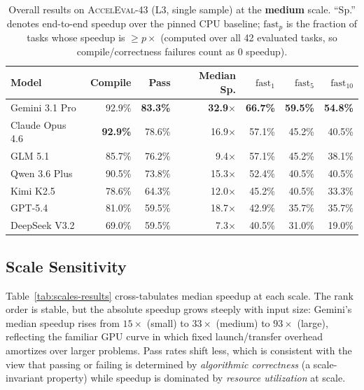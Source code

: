 \documentclass{article}
\begin{document}
\begin{table}[ht]
\centering
\small
\caption{Overall results on \textsc{AccelEval}-43 (L3, single sample) at the \textbf{medium} scale. ``Sp.'' denotes end-to-end speedup over the pinned CPU baseline; $\mathrm{fast}_p$ is the fraction of tasks whose speedup is $\geq p\times$ (computed over all 42 evaluated tasks, so compile/correctness failures count as $0$ speedup).}
\label{tab:overall}
\begin{tabular}{@{}lrrrrrr@{}}
\toprule
\textbf{Model} & \textbf{Compile} & \textbf{Pass} & \textbf{Median Sp.} & \textbf{$\mathrm{fast}_1$} & \textbf{$\mathrm{fast}_5$} & \textbf{$\mathrm{fast}_{10}$} \\
\midrule
Gemini 3.1 Pro     & 92.9\% & \textbf{83.3\%} & \textbf{32.9$\times$} & \textbf{66.7\%} & \textbf{59.5\%} & \textbf{54.8\%} \\
Claude Opus 4.6    & \textbf{92.9\%} & 78.6\% & 16.9$\times$ & 57.1\% & 45.2\% & 40.5\% \\
GLM 5.1            & 85.7\% & 76.2\% &  9.4$\times$ & 57.1\% & 45.2\% & 38.1\% \\
Qwen 3.6 Plus      & 90.5\% & 73.8\% & 15.3$\times$ & 52.4\% & 40.5\% & 40.5\% \\
Kimi K2.5          & 78.6\% & 64.3\% & 12.0$\times$ & 45.2\% & 40.5\% & 33.3\% \\
GPT-5.4            & 81.0\% & 59.5\% & 18.7$\times$ & 42.9\% & 35.7\% & 35.7\% \\
DeepSeek V3.2      & 69.0\% & 59.5\% &  7.3$\times$ & 40.5\% & 31.0\% & 19.0\% \\
\bottomrule
\end{tabular}
\end{table}

\subsection{Scale Sensitivity}

Table~\ref{tab:scales-results} cross-tabulates median speedup at each scale. The rank order is stable, but the absolute speedup grows steeply with input size: Gemini's median speedup rises from $15\times$ (small) to $33\times$ (medium) to $93\times$ (large), reflecting the familiar GPU curve in which fixed launch/transfer overhead amortizes over larger problems. Pass rates shift less, which is consistent with the view that passing or failing is determined by \emph{algorithmic correctness} (a scale-invariant property) while speedup is dominated by \emph{resource utilization} at scale.
\end{document}

